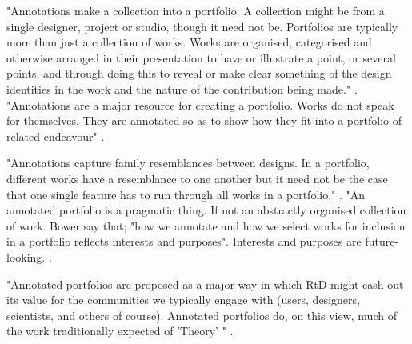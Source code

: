 "Annotations make a collection into a portfolio. A collection might be from a single designer, project or studio, though it need not be. Portfolios are typically more than just a collection of works. Works are organised, categorised and otherwise arranged in their presentation to have or illustrate a point, or several points, and through doing this to reveal or make clear something of the design identities in the work and the nature of the contribution being made." \autocite[p. 71]{bowers_annotated_2012}. "Annotations are a major resource for creating a portfolio. Works do not speak for themselves. They are annotated so as to show how they fit into a portfolio of related endeavour" \autocite[p. 71]{bowers_annotated_2012}.

"Annotations capture family resemblances between designs. In a portfolio, different works have a resemblance to one another but it need not be the case that one single feature has to run through all works in a portfolio." \autocite[p. 71]{bowers_annotated_2012}. "An annotated portfolio is a pragmatic thing. If not an abstractly organised collection of work. Bower say that; "how we annotate and how we select works for inclusion in a portfolio reflects interests and purposes". Interests and purposes are future-looking. \autocite[p. 73]{bowers_annotated_2012}.

"Annotated portfolios are proposed as a major way in which RtD might cash out its value for the communities we typically engage with (users, designers, scientists, and others of course). Annotated portfolios do, on this view, much of the work traditionally expected of 'Theory' " \autocite[p. 73]{bowers_annotated_2012}.
